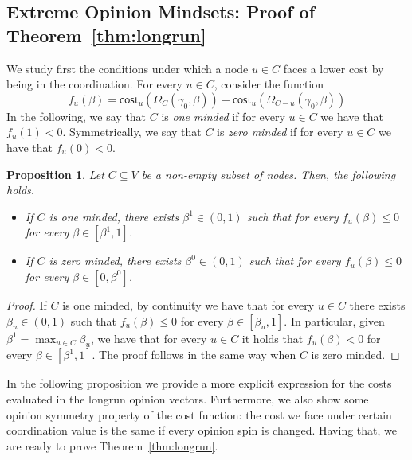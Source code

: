 \documentclass[letterpaper,11pt]{article}
\newcommand{\cost}{\mathsf{cost}}
\newtheorem{proposition}{Proposition}
\begin{document}
\subsection{Extreme Opinion Mindsets: Proof of Theorem~\ref{thm:longrun}}

We study first the conditions under which a node $u\in C$ faces a lower cost by being in the coordination.
For every $u\in C$, consider the function 
\begin{equation*}
f_u(\beta)=\cost_u(\Omega_C(\gamma_0,\beta))- \cost_u(\Omega_{C-u}(\gamma_0,\beta))
\end{equation*}
In the following, we say that $C$ is {\it one minded} if for every $u\in C$ we have that $f_u(1)<0$.
Symmetrically, we say that $C$ is {\it zero minded} if for every $u\in C$ we have that $f_u(0)<0$.

\begin{proposition}
\label{prop:minded}
Let $C\subseteq V$ be a non-empty subset of nodes.
Then, the following holds.
\begin{itemize}
	\item[$(a)$] If $C$ is one minded, there exists $\beta^{1}\in (0,1)$ such that for every $f_u(\beta)\le 0$ for every $\beta\in [\beta^1,1]$.
	\item[$(b)$] If $C$ is zero minded, there exists $\beta^{0}\in (0,1)$ such that for every $f_u(\beta)\le 0$ for every $\beta\in [0,\beta^0]$.
\end{itemize}
\end{proposition}

\begin{proof}
If $C$ is one minded, by continuity we have that for every $u\in C$ there exists $\beta_u\in (0,1)$ such that $f_u(\beta)\le 0$ for every $\beta\in [\beta_u,1]$. 
In particular, given $\beta^1=\max_{u\in C}\beta_u$, we have that for every $u\in C$ it holds that $f_u(\beta)<0$ for every $\beta\in [\beta^1,1]$.
The proof follows in the same way when $C$ is zero minded.
\end{proof}

In the following proposition we provide a more explicit expression for the costs evaluated in the longrun opinion vectors.
Furthermore, we also show some opinion symmetry property of the cost function: the cost we face under certain coordination value is the same if every opinion spin is changed. 
Having that, we are ready to prove Theorem~\ref{thm:longrun}.
\end{document}

